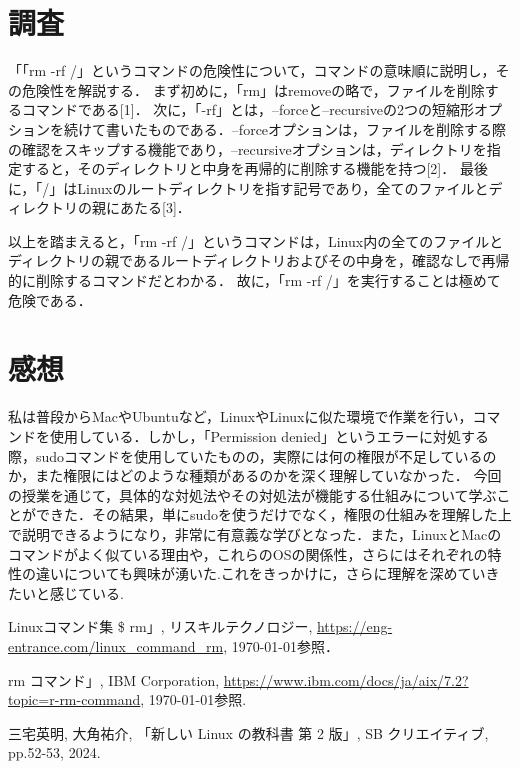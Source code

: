 \documentclass{jreport}  %
\begin{document}
\section{調査}
「「rm -rf /」というコマンドの危険性について，コマンドの意味順に説明し，その危険性を解説する．
まず初めに，「rm」はremoveの略で，ファイルを削除するコマンドである[1]．
次に，「-rf」とは，--forceと--recursiveの2つの短縮形オプションを続けて書いたものである．--forceオプションは，ファイルを削除する際の確認をスキップする機能であり，--recursiveオプションは，ディレクトリを指定すると，そのディレクトリと中身を再帰的に削除する機能を持つ[2]．
最後に，「/」はLinuxのルートディレクトリを指す記号であり，全てのファイルとディレクトリの親にあたる[3]．

以上を踏まえると，「rm -rf /」というコマンドは，Linux内の全てのファイルとディレクトリの親であるルートディレクトリおよびその中身を，確認なしで再帰的に削除するコマンドだとわかる．
故に，「rm -rf /」を実行することは極めて危険である．
\section{感想}
私は普段からMacやUbuntuなど，LinuxやLinuxに似た環境で作業を行い，コマンドを使用している．しかし，「Permission denied」というエラーに対処する際，sudoコマンドを使用していたものの，実際には何の権限が不足しているのか，また権限にはどのような種類があるのかを深く理解していなかった．
今回の授業を通じて，具体的な対処法やその対処法が機能する仕組みについて学ぶことができた．その結果，単にsudoを使うだけでなく，権限の仕組みを理解した上で説明できるようになり，非常に有意義な学びとなった．また，LinuxとMacのコマンドがよく似ている理由や，これらのOSの関係性，さらにはそれぞれの特性の違いについても興味が湧いた.これをきっかけに，さらに理解を深めていきたいと感じている.

\begin{thebibliography}{9}
    \item Linuxコマンド集 \$ rm」, リスキルテクノロジー, \url{https://eng-entrance.com/linux_command_rm}, \today 参照．
    \item rm コマンド」, IBM Corporation, \url{https://www.ibm.com/docs/ja/aix/7.2?topic=r-rm-command}, \today 参照.
    \item 三宅英明, 大角祐介, 「新しい Linux の教科書 第 2 版」, SB クリエイティブ, pp.52-53, 2024.
\end{thebibliography}
\end{document}
